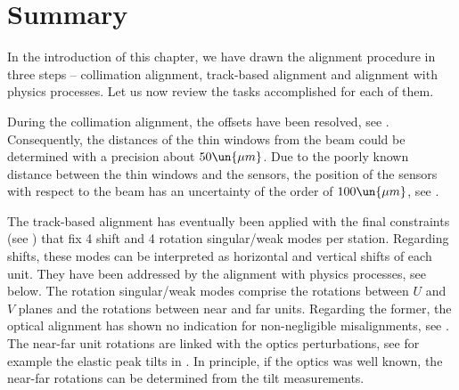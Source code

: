 \iffalse
\htab{al el ylyr}{
Left: the results of the elastic alignment method 4 -- fits of $y^{56}$ vs.~$y^{45}$ data. \TODO{}}{
\omit&\multispan2\bhrulefill\cr
\omit&\strut\hbox{near units}&\hbox{far units}\cr\bln
\hbox{21 Sep}    & -40.4 \pm   21.3&  78.6 \pm   21.4\cr\ln
\hbox{05 Oct}    & 170.8 \pm   26.3& 264.5 \pm   28.6\cr\ln
\hbox{07 Oct}    &  95.4 \pm   20.2& 181.9 \pm   21.8\cr\ln
\hbox{24 Oct}    & -75.8 \pm   10.7&  15.3 \pm   11.4\cr\ln
\hbox{26 Oct}    &  19.5 \pm    9.1&  98.6 \pm    9.9\cr\ln
\hbox{29-30 Oct} &-240.9 \pm    4.9&-158.3 \pm    4.9\cr\bln
}

-80		\pm30	&27		\pm31
377		\pm69	&477	\pm77
192		\pm55	&284	\pm61
-84		\pm30	&5		\pm33
56		\pm24	&145	\pm27
-270	\pm7	&-187	\pm7
\fi



\section[al sum]{Summary}

In the introduction of this chapter, we have drawn the alignment procedure in three steps -- collimation alignment, track-based alignment and alignment with physics processes. Let us now review the tasks accomplished for each of them.

\> During the collimation alignment, the  offsets have been resolved, see . Consequently, the distances of the  thin windows from the beam could be determined with a precision about $50\un{\mu m}$. Due to the poorly known distance between the thin windows and the sensors, the position of the sensors with respect to the beam has an uncertainty of the order of $100\un{\mu m}$, see .

\> The track-based alignment has eventually been applied with the final constraints (see ) that fix 4 shift and 4 rotation singular/weak modes per station. Regarding shifts, these modes can be interpreted as horizontal and vertical shifts of each unit. They have been addressed by the alignment with physics processes, see below. The rotation singular/weak modes comprise the rotations between $U$ and $V$ planes and the rotations between near and far units. Regarding the former, the optical alignment has shown no indication for non-negligible misalignments, see . The near-far unit rotations are linked with the optics perturbations, see for example the elastic peak tilts in . In principle, if the optics was well known, the near-far rotations can be determined from the tilt measurements.


